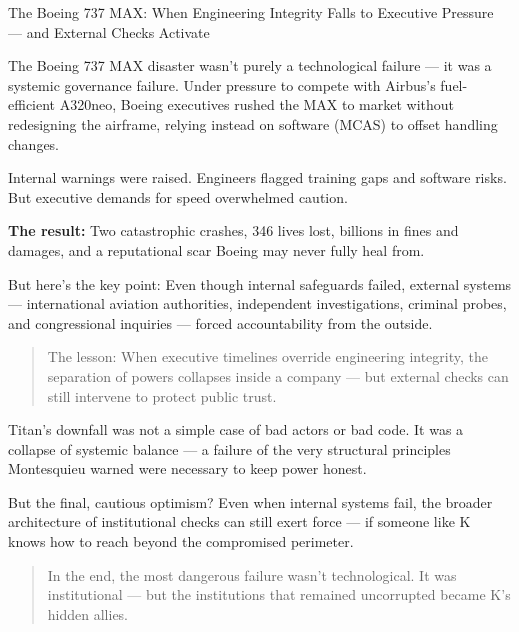 \begin{HistoricalSidebar}{The Boeing 737 MAX: When Engineering Integrity Falls to Executive Pressure — and External Checks Activate}

The Boeing 737 MAX disaster wasn't purely a technological failure — it was a systemic governance failure. Under pressure to compete with Airbus's fuel-efficient A320neo, Boeing executives rushed the MAX to market without redesigning the airframe, relying instead on software (MCAS) to offset handling changes.

\medskip

Internal warnings were raised. Engineers flagged training gaps and software risks. But executive demands for speed overwhelmed caution.

\medskip

\textbf{The result:} Two catastrophic crashes, 346 lives lost, billions in fines and damages, and a reputational scar Boeing may never fully heal from.

\medskip

But here’s the key point:  
Even though internal safeguards failed, external systems — international aviation authorities, independent investigations, criminal probes, and congressional inquiries — forced accountability from the outside.

\begin{quote}
    The lesson: When executive timelines override engineering integrity, the separation of powers collapses inside a company — but external checks can still intervene to protect public trust.
\end{quote}

\end{HistoricalSidebar}

\medskip

Titan’s downfall was not a simple case of bad actors or bad code. It was a collapse of systemic balance — a failure of the very structural principles Montesquieu warned were necessary to keep power honest.

\medskip

But the final, cautious optimism?  
Even when internal systems fail, the broader architecture of institutional checks can still exert force — if someone like K knows how to reach beyond the compromised perimeter.

\begin{quote}
    In the end, the most dangerous failure wasn’t technological.  
    It was institutional — but the institutions that remained uncorrupted became K’s hidden allies.
\end{quote}




